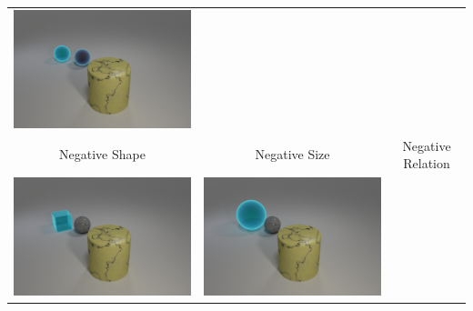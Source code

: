 \begin{table}
\begin{tabular}{@{}ccc@{}}
\begin{minipage}{.3\textwidth}
      \includegraphics[width=\linewidth]{figures/clevr_datasets/sclevr_mat1.png}
    \end{minipage}
\\
Negative Shape & Negative Size & Negative Relation \\
    \begin{minipage}{.3\textwidth}
      \includegraphics[width=\linewidth]{figures/clevr_datasets/sclevr_shape1.png}
    \end{minipage}
    &
    \begin{minipage}{.3\textwidth}
      \includegraphics[width=\linewidth]{figures/clevr_datasets/sclevr_size1.png}

\end{minipage}
\end{tabular}
\end{table}
